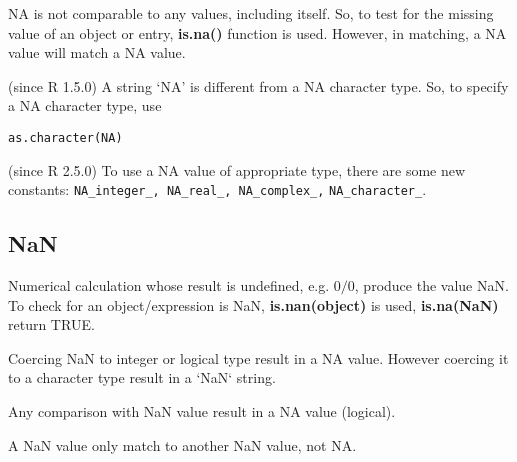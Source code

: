 NA is not comparable to any values, including itself. So, to test for
the missing value of an object or entry, {\bf is.na()} function is
used. However, in matching, a NA value will match a NA value.

(since R 1.5.0) A string `NA' is different from a NA character
type. So, to specify a NA character type, use
\begin{lstlisting}
as.character(NA)
\end{lstlisting}

(since R 2.5.0) To use a NA value of appropriate type, there are some
new constants: \lstinline!NA_integer_, NA_real_, NA_complex_,!
\lstinline!NA_character_!.


\subsection{NaN}
\label{sec:nan}

Numerical calculation whose result is undefined, e.g. $0/0$, produce
the value NaN. To check for an object/expression is NaN, {\bf
  is.nan(object)} is used, {\bf is.na(NaN)} return TRUE. 

Coercing NaN to integer or logical type result in a NA value. However
coercing it to a character type result in a `NaN` string. 

Any comparison with NaN value result in a NA value (logical). 

A NaN value only match to another NaN value, not NA.



